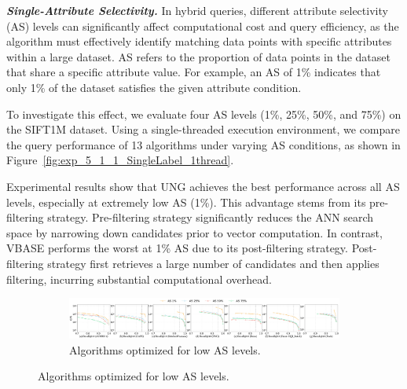 \documentclass[sigconf, nonacm]{acmart}
\begin{document}
\begin{sloppypar}
\textit{\textbf{Single-Attribute Selectivity.}}
In hybrid queries, different attribute selectivity (AS) levels can significantly affect computational cost and query efficiency, as the algorithm must effectively identify matching data points with specific attributes within a large dataset. AS refers to the proportion of data points in the dataset that share a specific attribute value. For example, an AS of 1\% indicates that only 1\% of the dataset satisfies the given attribute condition. 

To investigate this effect, we evaluate four AS levels (1\%, 25\%, 50\%, and 75\%) on the SIFT1M dataset. Using a single-threaded execution environment, we compare the query performance of 13 algorithms under varying AS conditions, as shown in Figure~\ref{fig:exp_5_1_1_SingleLabel_1thread}.

Experimental results show that UNG achieves the best performance across all AS levels, especially at extremely low AS (1\%). 
This advantage stems from its pre-filtering strategy. Pre-filtering strategy significantly reduces the ANN search space by narrowing down candidates prior to vector computation. In contrast, VBASE performs the worst at 1\% AS due to its post-filtering strategy. Post-filtering strategy first retrieves a large number of candidates and then applies filtering, incurring substantial computational overhead.




\begin{figure}
    \centering
    
    \begin{subfigure}{\textwidth}
        \centering
        \setlength{\abovecaptionskip}{0cm}
        \setlength{\belowcaptionskip}{0cm}
        \includegraphics[width=\textwidth]{figures/exp/exp_5_2_1.pdf}
        \caption{Algorithms optimized for low AS levels.}
        \label{fig:exp_5_2_1}
    \end{subfigure}
    
    \vfill %


\end{figure}
\end{sloppypar}
\end{document}
